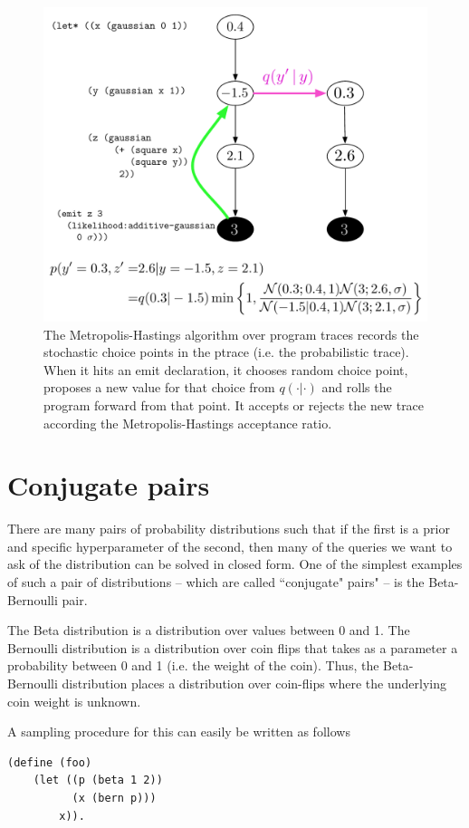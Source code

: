 \documentclass{article}
\begin{document}
\begin{figure}
\includegraphics[width=\textwidth]{figures/ptrace.pdf}
\caption{The Metropolis-Hastings algorithm over program traces records the
stochastic choice points in the ptrace (i.e. the probabilistic trace). When it
hits an emit declaration, it chooses random choice point, proposes a new
value for that choice from $q(\cdot | \cdot)$ and rolls the program forward from
that point. It accepts or rejects the new trace according the
Metropolis-Hastings acceptance ratio.} \label{fig:ptrace}
\end{figure}

\section{Conjugate pairs}
There are many pairs of probability distributions such that if the first is a
prior and specific hyperparameter of the second, then many of the queries we
want to ask of the distribution can be solved in closed form. One of the
simplest examples of such a pair of distributions -- which are called
``conjugate" pairs" -- is the Beta-Bernoulli pair.


The Beta distribution is a distribution over values between 0 and 1. The
Bernoulli distribution is a distribution over coin flips that takes as a
parameter a probability between 0 and 1 (i.e. the weight of the coin). Thus,
the Beta-Bernoulli distribution places a distribution over coin-flips where
the underlying coin weight is unknown. 

A sampling procedure for this can easily be written as follows 
\begin{verbatim}
(define (foo)
    (let ((p (beta 1 2))
          (x (bern p)))
        x)).
\end{verbatim}
\end{document}
